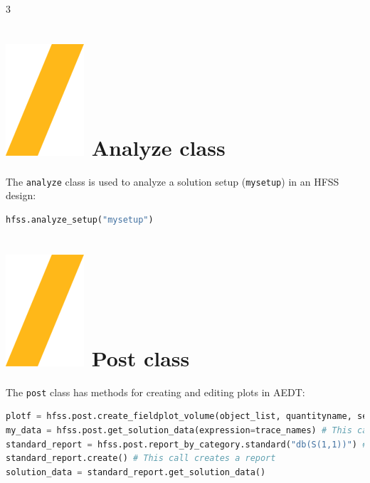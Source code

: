 \documentclass[9pt,landscape]{article}
\begin{document}
\begin{multicols}{3}
\section{\includegraphics[height=\fontcharht\font`\S]{slash.png} Analyze class}
The \texttt{analyze} class is used to analyze a solution setup (\texttt{mysetup}) in an HFSS design:
\begin{lstlisting}[language=Python]
hfss.analyze_setup("mysetup")
\end{lstlisting}
\section{\includegraphics[height=\fontcharht\font`\S]{slash.png} Post class}
The \texttt{post} class has methods for creating and editing plots in AEDT:
\begin{lstlisting}[language=Python]
plotf = hfss.post.create_fieldplot_volume(object_list, quantityname, setup_name, intrinsic_dict) # This call returns a FieldPlot object
my_data = hfss.post.get_solution_data(expression=trace_names) # This call returns a SolutionData object
standard_report = hfss.post.report_by_category.standard("db(S(1,1))") # This call returns a new standard report object
standard_report.create() # This call creates a report
solution_data = standard_report.get_solution_data()
\end{lstlisting}


\end{multicols}
\end{document}
